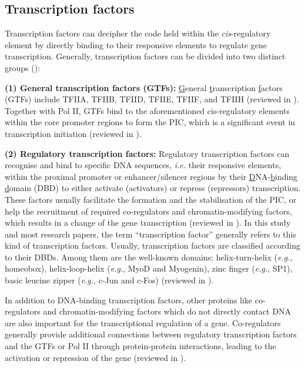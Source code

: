 \subsection{Transcription factors} \label{section:tf}

Transcription factors can decipher the code held within the \textit{cis}-regulatory element by directly binding to their responsive elements to regulate gene transcription. Generally, transcription factors can be divided into two distinct groups (\cite{lemon2000orchestrated}):

\textbf{(1) General transcription factors (GTFs):} \underline{G}eneral \underline{t}ranscription \underline{f}actors (GTFs) include TFIIA, TFIIB, TFIID, TFIIE, TFIIF, and TFIIH (reviewed in \cite{reese2003basal,thomas2006the,sikorski2009the}). Together with Pol II, GTFs bind to the aforementioned cis-regulatory elements within the core promoter regions to form the PIC, which is a significant event in transcription initiation (reviewed in \cite{juven-gershon2008the}).

\textbf{(2) Regulatory transcription factors:} Regulatory transcription factors can recognise and bind to specific DNA sequences, \textit{i.e.} their responsive elements, within the proximal promoter or enhancer/silencer regions by their \underline{D}NA-\underline{b}inding \underline{d}omain (DBD) to either activate (activators) or repress (repressors) transcription. These factors usually facilitate the formation and the stabilisation of the PIC, or help the recruitment of required co-regulators and chromatin-modifying factors, which results in a change of the gene transcription (reviewed in \cite{ptashne1988how,narlikar2002cooperation}). In this study and most research papers, the term \enquote{transcription factor} generally refers to this kind of transcription factors. Usually, transcription factors are classified according to their DBDs. Among them are the well-known domains: helix-turn-helix (\textit{e.g.}, homeobox), helix-loop-helix (\textit{e.g.}, MyoD and Myogenin), zinc finger (\textit{e.g.}, SP1), basic leucine zipper (\textit{e.g.}, c-Jun and c-Fos) (reviewed in \cite{latchman1997transcription}).

In addition to DNA-binding transcription factors, other proteins like co-regulators and chromatin-modifying factors which do not directly contact DNA are also important for the transcriptional regulation of a gene. Co-regulators generally provide additional connections between regulatory transcription factors and the GTFs or Pol II through protein-protein interactions, leading to the activation or repression of the gene (reviewed in \cite{näär2001transcriptional}).

